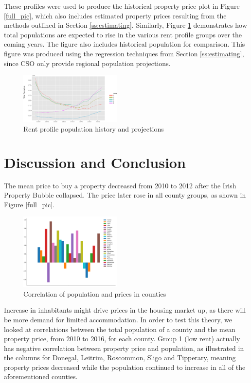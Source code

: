 \documentclass[twocolumn]{article}
\begin{document}
These profiles were used to produce the historical property price plot in
Figure \ref{full_pic}, which also includes estimated property prices
resulting from the methods outlined in Section \ref{ss:estimating}.
Similarly, Figure \ref{pop_full_pic} demonstrates how total populations are
expected to rise in the various rent profile groups over the coming years.  The
figure also includes historical population for comparison.  This figure
was produced using the regression techniques from Section
\ref{ss:estimating}, since CSO only provide regional population projections.

\begin{figure}[h]
    \centering
    \includegraphics[width=0.455\textwidth]{media/pdf/population_by_group.svg.pdf}
    \caption{Rent profile population history and projections \label{pop_full_pic}}
\end{figure}

\section{Discussion and Conclusion}
The mean price to buy a property decreased from 2010 to 2012
after the Irish Property Bubble collapsed. The price later rose in all
county groups, as shown in Figure \ref{full_pic}.
\begin{figure}[h]
    \centering
    \includegraphics[width=0.455\textwidth]{media/correlations_between_population_and_price_by_county.png}
    \caption{Correlation of population and prices in counties\label{corr_pop}}
\end{figure}

Increase in inhabitants might drive prices in the housing market up, as
there will be more demand for limited accommodation. In order to
test this theory, we looked at correlations between the total population of a
county and the mean property price, from 2010 to 2016, for each county.  Group
1 (low rent) actually has negative correlation between property price and
population, as illustrated in the columns for Donegal, Leitrim, Roscommon,
Sligo and Tipperary, meaning property prices decreased while the population
continued to increase in all of the aforementioned counties.
\end{document}
